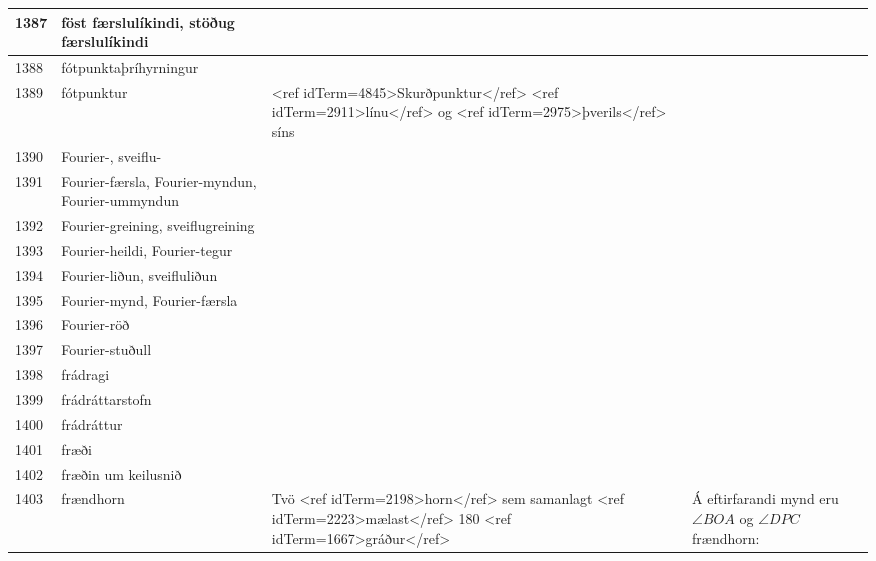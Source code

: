 \begin{longtable}{p{}|p{}|p{}|p{}|p{}}
\hline
1387 & föst færslulíkindi, stöðug færslulíkindi &  &  &  \\
\hline
1388 & fótpunktaþríhyrningur &  &  &  \\
\hline
1389 & fótpunktur & <ref idTerm=4845>Skurðpunktur</ref> <ref idTerm=2911>línu</ref> og <ref idTerm=2975>þverils</ref> síns &  &  \\
\hline
1390 & Fourier-, sveiflu- &  &  &  \\
\hline
1391 & Fourier-færsla, Fourier-myndun, Fourier-ummyndun &  &  &  \\
\hline
1392 & Fourier-greining, sveiflugreining &  &  &  \\
\hline
1393 & Fourier-heildi, Fourier-tegur &  &  &  \\
\hline
1394 & Fourier-liðun, sveifluliðun &  &  &  \\
\hline
1395 & Fourier-mynd, Fourier-færsla &  &  &  \\
\hline
1396 & Fourier-röð &  &  &  \\
\hline
1397 & Fourier-stuðull &  &  &  \\
\hline
1398 & frádragi &  &  &  \\
\hline
1399 & frádráttarstofn &  &  &  \\
\hline
1400 & frádráttur &  &  &  \\
\hline
1401 & fræði &  &  &  \\
\hline
1402 & fræðin um keilusnið &  &  &  \\
\hline
1403 & frændhorn & Tvö <ref idTerm=2198>horn</ref> sem samanlagt <ref idTerm=2223>mælast</ref> 180 <ref idTerm=1667>gráður</ref> & Á eftirfarandi mynd eru $\angle BOA$ og $\angle DPC$ frændhorn:


\end{longtable}
